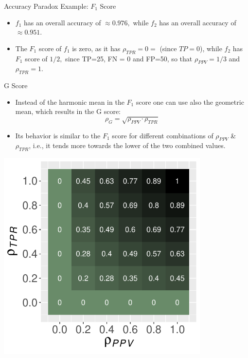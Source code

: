 \documentclass[11pt,compress,t,notes=noshow, xcolor=table]{beamer}
\begin{document}
\begin{vbframe}{Accuracy Paradox Example: $F_1$ Score}
\begin{itemize}
\begin{minipage}{0.35\textwidth}
\begin{center}
			\end{center}
		\end{minipage}
		\item $f_1$ has an overall accuracy of $\approx 0.976,$ while $f_2$ has an overall accuracy of $\approx 0.951.$
		\item The $F_1$ score of $f_1$ is zero, as it has $\rho_{TPR}=0=$ (since $TP=0$), while $f_2$ has  $F_1$ score of $1/2,$ since TP=25, FN = 0 and FP=50, so that $\rho_{PPV}=1/3$ and $\rho_{TPR}=1.$
	\end{itemize}
\end{vbframe} 




\begin{vbframe}{G Score}
	\footnotesize
	
	\begin{minipage}[c]{0.5\textwidth}
	\footnotesize
	\begin{itemize}
		\item 	Instead of the harmonic mean in the $F_1$ score one can use also the geometric mean, which results in the G score: 
		$$\rho_{G} = \sqrt{\rho_{PPV} \cdot \rho_{TPR}}$$
		\item  Its behavior is similar to the $F_1$ score for different combinations of $\rho_{PPV}$ \& $\rho_{TPR}$, i.e., it tends more towards the lower of the two combined values.
	\end{itemize}
\end{minipage}%
\begin{minipage}[c]{0.5\textwidth}
	\centering
	\includegraphics[width=0.8\textwidth]{figure/g_score_plot.pdf}

\end{minipage}
\end{vbframe}
\end{document}

